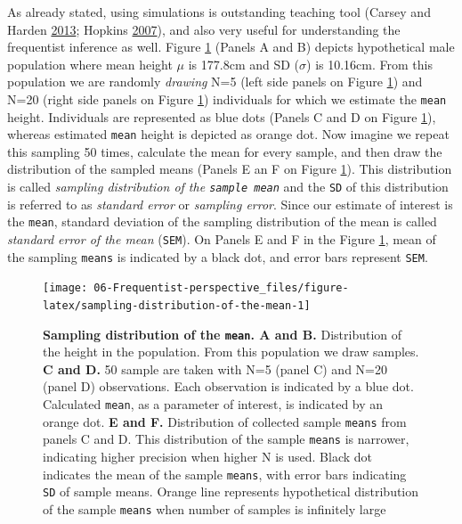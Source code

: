 \documentclass[
]{book}
\begin{document}
As already stated, using simulations is outstanding teaching tool (Carsey and Harden \protect\hyperlink{ref-carseyMonteCarloSimulation2013}{2013}; Hopkins \protect\hyperlink{ref-hopkinsUnderstandingStatisticsUsing2007}{2007}), and also very useful for understanding the frequentist inference as well. Figure \ref{fig:sampling-distribution-of-the-mean} (Panels A and B) depicts hypothetical male population where mean height \(\mu\) is 177.8cm and SD (\(\sigma\)) is 10.16cm. From this population we are randomly \emph{drawing} N=5 (left side panels on Figure \ref{fig:sampling-distribution-of-the-mean}) and N=20 (right side panels on Figure \ref{fig:sampling-distribution-of-the-mean}) individuals for which we estimate the \texttt{mean} height. Individuals are represented as blue dots (Panels C and D on Figure \ref{fig:sampling-distribution-of-the-mean}), whereas estimated \texttt{mean} height is depicted as orange dot. Now imagine we repeat this sampling 50 times, calculate the mean for every sample, and then draw the distribution of the sampled means (Panels E an F on Figure \ref{fig:sampling-distribution-of-the-mean}). This distribution is called \emph{sampling distribution of the \texttt{sample\ mean}} and the \texttt{SD} of this distribution is referred to as \emph{standard error} or \emph{sampling error}. Since our estimate of interest is the \texttt{mean}, standard deviation of the sampling distribution of the mean is called \emph{standard error of the mean} (\texttt{SEM}). On Panels E and F in the Figure \ref{fig:sampling-distribution-of-the-mean}, mean of the sampling \texttt{means} is indicated by a black dot, and error bars represent \texttt{SEM}.

\begin{figure}

{\centering \texttt{[image: 06-Frequentist-perspective\_files/figure-latex/sampling-distribution-of-the-mean-1]} 

}

\caption{\textbf{Sampling distribution of the \texttt{mean}. A and B. }Distribution of the height in the population. From this population we draw samples. \textbf{C and D.} 50 sample are taken with N=5 (panel C) and N=20 (panel D) observations. Each observation is indicated by a blue dot. Calculated \texttt{mean}, as a parameter of interest, is indicated by an orange dot. \textbf{E and F.} Distribution of collected sample \texttt{means} from panels C and D. This distribution of the sample \texttt{means} is narrower, indicating higher precision when higher N is used. Black dot indicates the mean of the sample \texttt{means}, with error bars indicating \texttt{SD} of sample means. Orange line represents hypothetical distribution of the sample \texttt{means} when number of samples is infinitely large}\label{fig:sampling-distribution-of-the-mean}
\end{figure}
\end{document}
